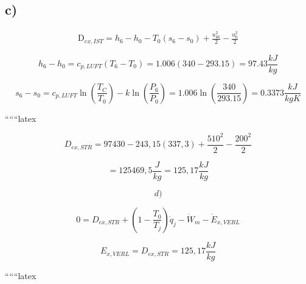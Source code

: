 \subsection*{c)}

\[
\begin{array}{c}
\text{D}_{ex,IST} = h_6 - h_0 - T_0 (s_6 - s_0) + \frac{u_{k6}^2}{2} - \frac{u_0^2}{2}
\end{array}
\]

\[
h_6 - h_0 = c_{p,LUFT} \left( T_6 - T_0 \right) = 1.006 \left( 340 - 293.15 \right) = 97.43 \frac{kJ}{kg}
\]

\[
s_6 - s_0 = c_{p,LUFT} \ln \left( \frac{T_C}{T_0} \right) - k \ln \left( \frac{P_6}{P_0} \right) = 1.006 \ln \left( \frac{340}{293.15} \right) = 0.3373 \frac{kJ}{kgK}
\]

``````latex


\[
D_{ex,STR} = 97430 - 243,15 (337,3) + \frac{510^2}{2} - \frac{200^2}{2}
\]

\[
= 125469,5 \frac{J}{kg} = 125,17 \frac{kJ}{kg}
\]

\[
d)
\]

\[
0 = D_{ex,STR} + \left(1 - \frac{T_0}{T_j}\right) \dot{q}_j - \dot{W}_m - \dot{E}_{x,VERL}
\]

\[
E_{x,VERL} = D_{ex,STR} = 125,17 \frac{kJ}{kg}
\]

``````latex



